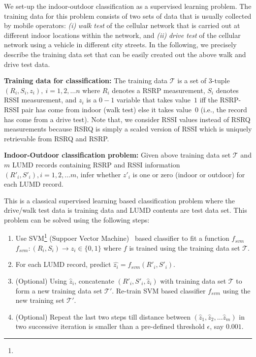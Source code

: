 \documentclass[conference, 10pt]{IEEEtran}
\begin{document}
We set-up the indoor-outdoor classification as a supervised learning problem. The
training data for this problem consists of two sets of data that is usually collected
by mobile operators: {\em (i)} {\em walk
test} of the cellular network that is carried out at different indoor locations
within the network, and {\em (ii)} {\em drive test} of the cellular network using a
vehicle in different city streets. In the following, we precisely describe the
training data set that can be easily created out the above walk and drive test data.

{\bf Training data for classification:} The training data ${\mathcal T}$ is a set of 3-tuple
$(R_i, S_i, z_i),\ i=1,2,\hdots n$ where $R_i$ denotes a RSRP measurement, $S_i$
denotes RSSI measurement, and $z_i$ is a $0-1$ variable that takes value~$1$ iff the
RSRP-RSSI pair has come from indoor (walk test) else it takes value~0 (i.e., the
record has come from a drive test). Note that, we consider RSSI values instead of RSRQ
measurements because RSRQ is simply a scaled version of RSSI which is uniquely
retrievable from RSRQ and RSRP.

{\bf Indoor-Outdoor classification problem:} Given above training data set ${\mathcal
T}$ and $m$ LUMD records containing RSRP and RSSI information $({R'}_i, {S'}_i),
i=1,2,\hdots m$, infer whether ${z'}_i$ is one or zero (indoor or outdoor) for each
LUMD record.

This is a classical supervised learning based classification problem where the
drive/walk test data is training data and LUMD contents are test data set. This
problem can be solved using the following steps:

\begin{enumerate}

	\item Use SVM\footnote{} (Suppoer Vector Machine)~\cite{BishopML} based classifier to
		fit a function $f_{svm}$
		$f_{svm}: (R_i, S_i) \rightarrow z_i \in \{0,1\}$ where $f$ is trained using the
		training data set $\mathcal T$.

	\item For each LUMD record, predict $\hat{z_i}=f_{svm}({R'}_i, {S'}_i)$.

	\item (Optional) Using $\hat{z}_i$, concatenate $({R'}_i, {S'}_i, \hat{z}_i)$
		with training data set $\mathcal T$ to form a new training data set
		$\mathcal T'$. Re-train SVM based classifier $f_{svm}$ using the new
		training set $\mathcal T'$.

	\item (Optional) Repeat the last two steps till distance between
		$(\hat{z}_1,\hat{z}_2,\hdots\hat{z}_m)$ in two successive iteration
		is smaller  than a pre-defined threshold $\epsilon$, say $0.001$.
\end{enumerate}
\end{document}
